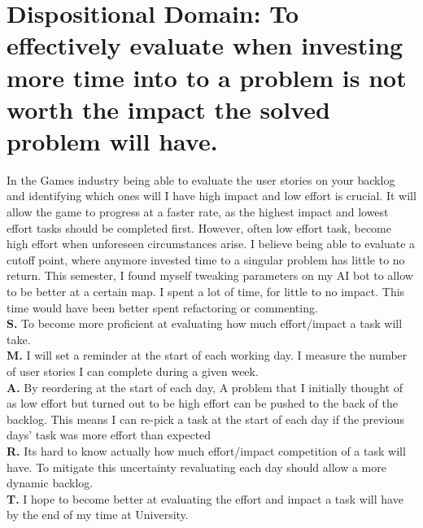\documentclass{scrartcl}
\begin{document}
\section{Dispositional Domain: To effectively evaluate when investing more time into to a problem is not worth the impact the solved problem will have.}
In the Games industry being able to evaluate the user stories on your backlog and identifying which ones will I have high impact and low effort is crucial. It will allow the game to progress at a faster rate, as the highest impact and lowest effort tasks should be completed first. However, often low effort task, become high effort when unforeseen circumstances arise. I believe being able to evaluate a cutoff point, where anymore invested time to a singular problem has little to no return. This semester, I found myself tweaking parameters on my AI bot to allow to be better at a certain map. I spent a lot of time, for little to no impact. This time would have been better spent refactoring or commenting.\\
\textbf{S.}  To become more proficient at evaluating how much effort/impact a task will take.\\
\textbf{M.} I will set a reminder at the start of each working day. I measure the number of user stories I can complete during a given week.\\
\textbf{A.}  By reordering at the start of each day, A problem that I initially thought of as low effort but turned out to be high effort can be pushed to the back of the backlog. This means I can re-pick a task at the start of each day if the previous days' task was more effort than expected\\
\textbf{R.} Its hard to know actually how much effort/impact competition of a task will have. To mitigate this uncertainty revaluating each day should allow a more dynamic backlog.\\
\textbf{T.} I hope to become better at evaluating  the effort and impact a task will have by the end of my time at University.\\
\end{document}
